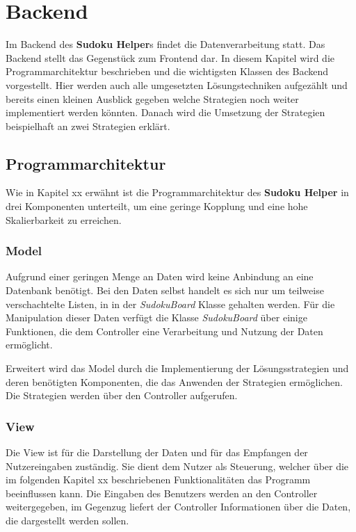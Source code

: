 
\chapter{Backend}

Im Backend des \textbf{Sudoku Helper}s findet die Datenverarbeitung statt. Das Backend stellt das Gegenstück zum Frontend dar. In diesem Kapitel wird die Programmarchitektur beschrieben und die wichtigsten Klassen des Backend vorgestellt. Hier werden auch alle umgesetzten Lösungstechniken aufgezählt und bereits einen kleinen Ausblick gegeben welche Strategien noch weiter implementiert werden könnten. Danach wird die Umsetzung der Strategien beispielhaft an zwei Strategien erklärt.


\section{Programmarchitektur}

Wie in Kapitel xx erwähnt ist die Programmarchitektur des \textbf{Sudoku Helper} in drei Komponenten unterteilt, um eine geringe Kopplung und eine hohe Skalierbarkeit zu erreichen. 

\subsection{Model}
Aufgrund einer geringen Menge an Daten wird keine Anbindung an eine Datenbank benötigt. Bei den Daten selbst handelt es sich nur um teilweise verschachtelte Listen, in in der \textit{SudokuBoard} Klasse gehalten werden. Für die Manipulation dieser Daten verfügt die Klasse \textit{SudokuBoard} über einige Funktionen, die dem Controller eine Verarbeitung und Nutzung der Daten ermöglicht.

Erweitert wird das Model durch die Implementierung der Lösungsstrategien und deren benötigten Komponenten, die das Anwenden der Strategien ermöglichen. Die Strategien werden über den Controller aufgerufen.

\subsection{View}
Die View ist für die Darstellung der Daten und für das Empfangen der Nutzereingaben zuständig. Sie dient dem Nutzer als Steuerung, welcher über die im folgenden Kapitel xx beschriebenen Funktionalitäten das Programm beeinflussen kann. Die Eingaben des Benutzers werden an den Controller weitergegeben, im Gegenzug liefert der Controller Informationen über die Daten, die dargestellt werden sollen. 

